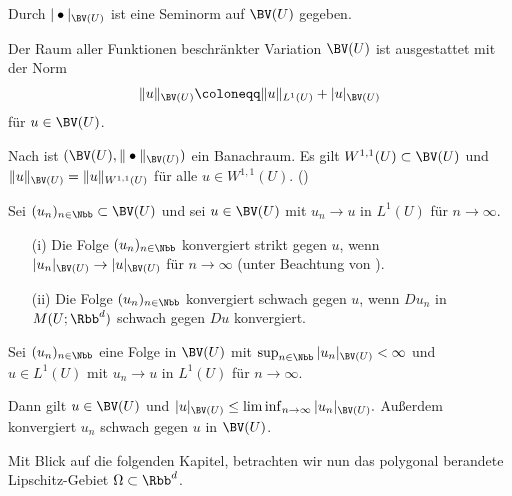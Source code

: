 \begin{remark}
  Durch $|\bullet|_{\BV(U)}$ ist eine Seminorm auf $\BV(U)$
  gegeben.

  Der Raum aller Funktionen beschränkter Variation $\BV(U)$
  ist ausgestattet mit der Norm 
  \begin{align*}
    \Vert u \Vert_{\BV(U)} \coloneqq \Vert u\Vert_{L^1(U)} +
    |u|_{\BV(U)}
  \end{align*}
  für $u\in\BV(U)$.

  Nach \cite[S. 395, Theorem 10.1.1.]{ABM14} ist $(\BV(U),
  \Vert\bullet\Vert_{\BV(U)})$ ein Banachraum.
  Es gilt $W^{1,1}(U)\subset\BV(U)$ und 
  $\Vert u \Vert_{\BV(U)}=\Vert u \Vert_{W^{1,1}(U)}$ für alle
  $u\in W^{1,1}(U)$. (\cite[S. 394]{ABM14})
\end{remark}

\begin{definition}
  Sei $(u_n)_{n\in\Nbb}\subset \BV(U)$ und sei $u\in \BV(U)$ mit
  $u_n\rightarrow u$ in $L^1(U)$ für $n\rightarrow\infty$.
  \begin{itemize}
    \item[(i)]
      Die Folge $(u_n)_{n\in\Nbb}$ konvergiert strikt gegen $u$,
      wenn $|u_n|_{\BV(U)}\rightarrow |u|_{\BV(U)}$ für
      $n\rightarrow\infty$
      (unter Beachtung von \cite[Remark 10.1.1]{ABM14}).
    \item[(ii)] Die Folge $(u_n)_{n\in\Nbb}$ konvergiert
      schwach gegen $u$, wenn
      $Du_n$ in 
      $M(U;\Rbb^d)$ schwach gegen $Du$ konvergiert.
  \end{itemize}
\end{definition}

\begin{theorem}
  \label{thm:wlsc}
  Sei $(u_n)_{n\in\Nbb}$ eine Folge in $\BV(U)$ mit
  $\sup_{n\in\Nbb}|u_n|_{\BV(U)}< \infty$ und $u\in L^1(U)$ 
  mit $u_n\rightarrow u$ in $L^1(U)$ für $n\rightarrow\infty$.

  Dann gilt $u\in\BV(U)$ und $|u|_{\BV(U)}\leq
  \liminf_{n\rightarrow\infty}|u_n|_{\BV(U)}.$
  Außerdem konvergiert $u_n$ schwach gegen $u$ in $\BV(U)$.
\end{theorem}

Mit Blick auf die folgenden Kapitel, betrachten wir nun
das polygonal berandete Lipschitz-Gebiet $\Omega\subset\Rbb^d$.


